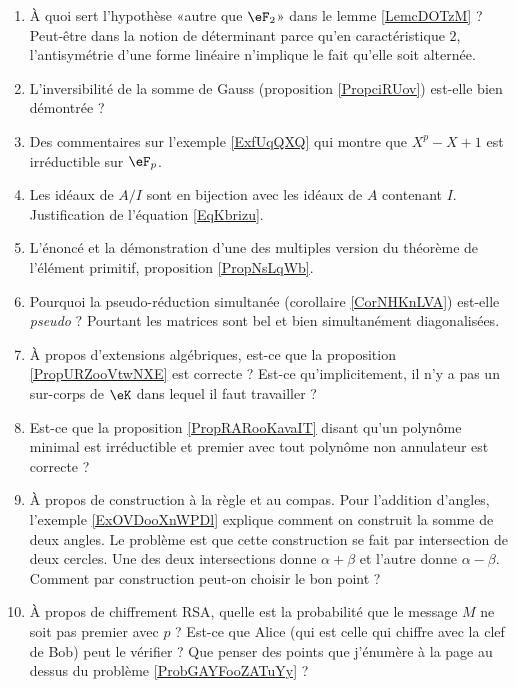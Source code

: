 \begin{enumerate}
    \item
        À quoi sert l'hypothèse «autre que \( \eF_2\)» dans le lemme \ref{LemcDOTzM} ? Peut-être dans la notion de déterminant parce qu'en caractéristique \( 2\), l'antisymétrie d'une forme linéaire n'implique le fait qu'elle soit alternée.
    \item
        L'inversibilité de la somme de Gauss (proposition \ref{PropciRUov}) est-elle bien démontrée ?
    \item
        Des commentaires sur l'exemple \ref{ExfUqQXQ} qui montre que \( X^p-X+1\) est irréductible sur \( \eF_p\).
    \item
        Les idéaux de \( A/I\) sont en bijection avec les idéaux de \( A\) contenant \( I\). Justification de l'équation \eqref{EqKbrizu}.
    \item
        L'énoncé et la démonstration d'une des multiples version du théorème de l'élément primitif, proposition \ref{PropNsLqWb}.
    \item
        Pourquoi la pseudo-réduction simultanée (corollaire \ref{CorNHKnLVA}) est-elle \emph{pseudo} ? Pourtant les matrices sont bel et bien simultanément diagonalisées.
    \item
        À propos d'extensions algébriques, est-ce que la proposition \ref{PropURZooVtwNXE} est correcte ? Est-ce qu'implicitement, il n'y a pas un sur-corps de \( \eK\) dans lequel il faut travailler ?
    \item
        Est-ce que la proposition \ref{PropRARooKavaIT} disant qu'un polynôme minimal est irréductible et premier avec tout polynôme non annulateur est correcte ?
    \item
        À propos de construction à la règle et au compas. Pour l'addition d'angles, l'exemple \ref{ExOVDooXnWPDl} explique comment on construit la somme de deux angles. Le problème est que cette construction se fait par intersection de deux cercles. Une des deux intersections donne \( \alpha+\beta\) et l'autre donne \( \alpha-\beta\). Comment par construction peut-on choisir le bon point ?
    \item
        À propos de chiffrement RSA, quelle est la probabilité que le message \( M\) ne soit pas premier avec \( p\) ? Est-ce que Alice (qui est celle qui chiffre avec la clef de Bob) peut le vérifier ? Que penser des points que j'énumère à la page \pageref{PageAKTBooMDeQxY} au dessus du problème \ref{ProbGAYFooZATuYy} ?
\end{enumerate}

